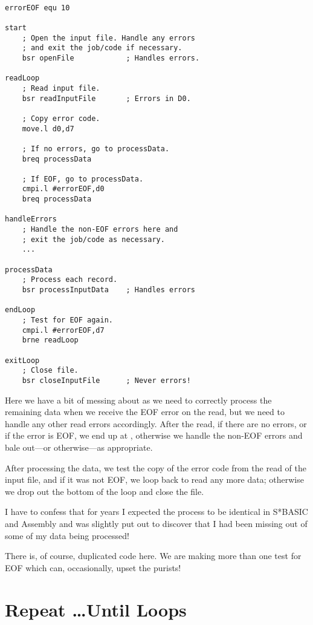 \begin{lstlisting}[caption={Repeat loops with EOF exit in Assembly Code},label={lis: Repeat loop with EOF exit}]
    
errorEOF equ 10

start
    ; Open the input file. Handle any errors
    ; and exit the job/code if necessary.
    bsr openFile			; Handles errors.

readLoop
    ; Read input file.
    bsr readInputFile		; Errors in D0.
    
    ; Copy error code.
    move.l d0,d7

    ; If no errors, go to processData.
    breq processData
    
    ; If EOF, go to processData.
    cmpi.l #errorEOF,d0
    breq processData
    
handleErrors
    ; Handle the non-EOF errors here and
    ; exit the job/code as necessary.
    ...

processData
    ; Process each record.
    bsr processInputData	; Handles errors

endLoop
    ; Test for EOF again.
    cmpi.l #errorEOF,d7
    brne readLoop

exitLoop
    ; Close file.    
    bsr closeInputFile		; Never errors!
\end{lstlisting}

Here we have a bit of messing about as we need to correctly process the remaining data when we receive the EOF error on the read, but we need to handle any other read errors accordingly. After the read, if there are no errors, or if the error is EOF, we end up at , otherwise we handle the non-EOF errors and bale out---or otherwise---as appropriate.

After processing the data, we test the copy of the error code from the read of the input file, and if it was not EOF, we loop back to read any more data; otherwise we drop out the bottom of the loop and close the file.

I have to confess that for years I expected the process to be identical in S*BASIC and Assembly and was slightly put out to discover that I had been missing out of some of my data being processed!

There is, of course, duplicated code here. We are making more than one test for EOF which can, occasionally, upset the purists!



\section{Repeat \ldots\protect Until Loops}

